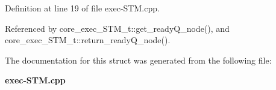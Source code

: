 Definition at line 19 of file exec-STM.cpp.

Referenced by core\_\-exec\_\-STM\_\-t::get\_\-readyQ\_\-node(), and core\_\-exec\_\-STM\_\-t::return\_\-readyQ\_\-node().

The documentation for this struct was generated from the following file:\begin{CompactItemize}
\item 
{\bf exec-STM.cpp}\end{CompactItemize}
